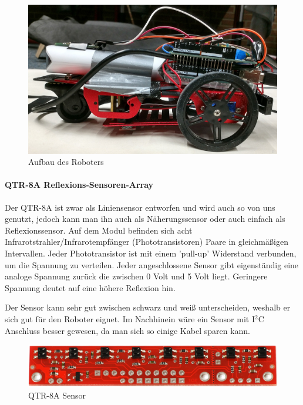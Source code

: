 \documentclass[12pt]{article}
\begin{document}
\begin{figure}[thb]
\includegraphics[width=1\textwidth]{images/vehicle_side_small.jpg}
\caption{Aufbau des Roboters}
\end{figure}

\paragraph{QTR-8A Reflexions-Sensoren-Array} Der QTR-8A ist zwar als Liniensensor entworfen und wird auch so von uns genutzt, jedoch kann man ihn auch als Näherungssensor oder auch einfach als Reflexionssensor. Auf dem Modul befinden sich acht Infrarotstrahler/Infrarotempfänger (Phototransistoren) Paare in gleichmäßigen Intervallen. Jeder Phototransistor ist mit einem 'pull-up' Widerstand verbunden, um die Spannung zu verteilen. Jeder angeschlossene Sensor gibt eigenständig eine analoge Spannung zurück die zwischen 0 Volt und 5 Volt liegt. Geringere Spannung deutet auf eine höhere Reflexion hin.

Der Sensor kann sehr gut zwischen schwarz und weiß unterscheiden, weshalb er sich gut für den Roboter eignet. Im Nachhinein wäre ein Sensor mit I$^2$C Anschluss besser gewesen, da man sich so einige Kabel sparen kann.
\begin{figure}[thb]
\vspace{0.5cm}
\includegraphics[width=1\textwidth]{images/QTR-8A.jpg}\par
\caption{QTR-8A Sensor\cite{QTR8A-front}}
\end{figure}
\end{document}
